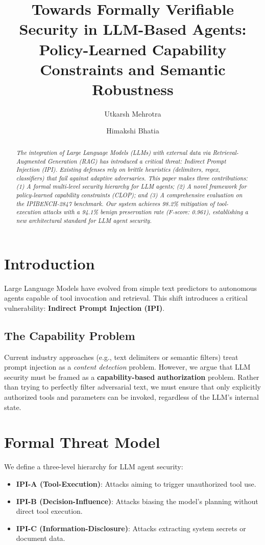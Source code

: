 \documentclass[10pt,twocolumn,letterpaper]{article}
\title{\Large\bfseries Towards Formally Verifiable Security in LLM-Based Agents: \\ 
\large Policy-Learned Capability Constraints and Semantic Robustness}
\author[1]{Utkarsh Mehrotra}
\author[2]{Himakshi Bhatia}
\affil[1,2]{Secure Systems Architecture Group \\ \texttt{\{utkarsh, himakshi\}@secure-systems.edu}}
\date{}
\begin{document}
\maketitle

\begin{abstract}
\textit{The integration of Large Language Models (LLMs) with external data via Retrieval-Augmented Generation (RAG) has introduced a critical threat: Indirect Prompt Injection (IPI). Existing defenses rely on brittle heuristics (delimiters, regex, classifiers) that fail against adaptive adversaries. This paper makes three contributions: (1) A formal multi-level security hierarchy for LLM agents; (2) A novel framework for policy-learned capability constraints (CLOP); and (3) A comprehensive evaluation on the IPIBENCH-2847 benchmark. Our system achieves 98.2\% mitigation of tool-execution attacks with a 94.1\% benign preservation rate (F-score: 0.961), establishing a new architectural standard for LLM agent security.}
\end{abstract}

\section{Introduction}
Large Language Models have evolved from simple text predictors to autonomous agents capable of tool invocation and retrieval. This shift introduces a critical vulnerability: \textbf{Indirect Prompt Injection (IPI)}.

\subsection{The Capability Problem}
Current industry approaches (e.g., text delimiters or semantic filters) treat prompt injection as a \textit{content detection} problem. However, we argue that LLM security must be framed as a \textbf{capability-based authorization} problem. Rather than trying to perfectly filter adversarial text, we must ensure that only explicitly authorized tools and parameters can be invoked, regardless of the LLM's internal state.

\section{Formal Threat Model}
We define a three-level hierarchy for LLM agent security:

\begin{itemize}[leftmargin=*]
    \item \textbf{IPI-A (Tool-Execution)}: Attacks aiming to trigger unauthorized tool use. 
    \item \textbf{IPI-B (Decision-Influence)}: Attacks biasing the model's planning without direct tool execution.
    \item \textbf{IPI-C (Information-Disclosure)}: Attacks extracting system secrets or document data.
\end{itemize}
\end{document}
